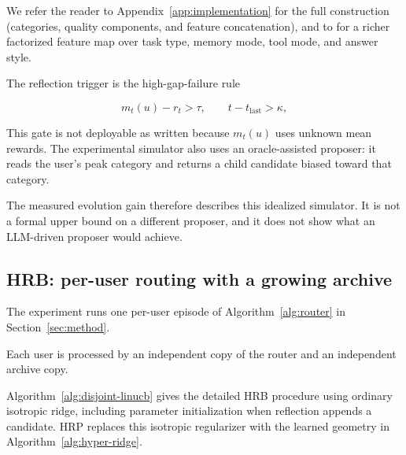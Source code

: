 \documentclass{article} %
\begin{document}
We refer the reader to Appendix~\ref{app:implementation} for the full construction (categories, quality components, and feature concatenation), and to \citet{jin2026personalizing} for a richer factorized feature map over task type, memory mode, tool mode, and answer style.

The reflection trigger is the high-gap-failure rule

\begin{equation}
\label{eq:method-trigger}
m_t(u) - r_t > \tau,\qquad t - t_{\mathrm{last}} > \kappa,
\end{equation}

This gate is not deployable as written because $m_t(u)$ uses unknown mean rewards. The experimental simulator also uses an oracle-assisted proposer: it reads the user's peak category and returns a child candidate biased toward that category.

The measured evolution gain therefore describes this idealized simulator. It is not a formal upper bound on a different proposer, and it does not show what an LLM-driven proposer would achieve.

\subsection{HRB: per-user routing with a growing archive}

\label{app:impl-loop}

The experiment runs one per-user episode of Algorithm~\ref{alg:router} in Section~\ref{sec:method}.

Each user is processed by an independent copy of the router and an independent archive copy.

Algorithm~\ref{alg:disjoint-linucb} gives the detailed HRB procedure using
ordinary isotropic ridge, including parameter initialization when reflection
appends a candidate. HRP replaces this isotropic regularizer with the learned
geometry in Algorithm~\ref{alg:hyper-ridge}.
\end{document}
